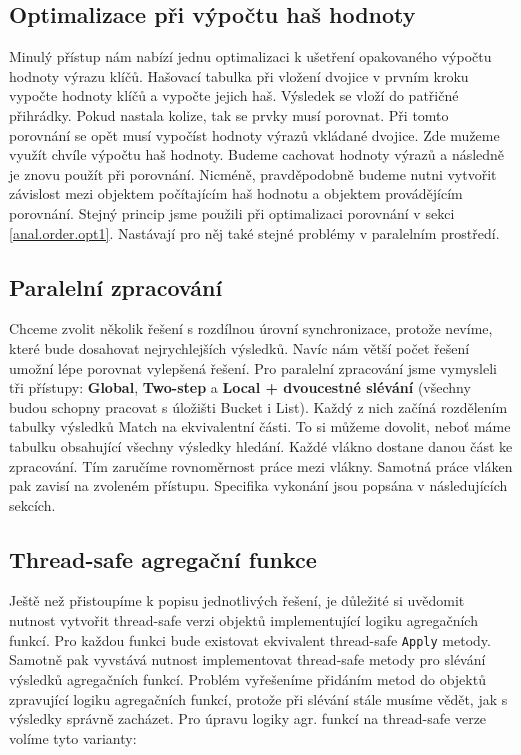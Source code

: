 \subsection{Optimalizace při výpočtu haš hodnoty}

Minulý přístup nám nabízí jednu optimalizaci k ušetření opakovaného výpočtu hodnoty výrazu klíčů.
Hašovací tabulka při vložení dvojice v prvním kroku vypočte hodnoty klíčů a vypočte jejich haš.
Výsledek se vloží do patřičné přihrádky.
Pokud nastala kolize, tak se prvky musí porovnat.
Při tomto porovnání se opět musí vypočíst hodnoty výrazů vkládané dvojice.
Zde mužeme využít chvíle výpočtu haš hodnoty.
Budeme cachovat hodnoty výrazů a následně je znovu použít při porovnání.
Nicméně, pravděpodobně budeme nutni vytvořit závislost mezi objektem počítajícím haš hodnotu a objektem provádějícím porovnání.
Stejný princip jsme použili při optimalizaci porovnání v sekci \ref{anal.order.opt1}.
Nastávají pro něj také stejné problémy v paralelním prostředí.

\subsection{Paralelní zpracování}

Chceme zvolit několik řešení s rozdílnou úrovní synchronizace, protože nevíme, které bude dosahovat nejrychlejších výsledků.
Navíc nám větší počet řešení umožní lépe porovnat vylepšená řešení.
Pro paralelní zpracování jsme vymysleli tři přístupy: \textbf{Global}, \textbf{Two-step} a \textbf{Local + dvoucestné slévání} (všechny budou schopny pracovat s úložišti Bucket i List).
Každý z nich začíná rozdělením tabulky výsledků Match na ekvivalentní části.
To si můžeme dovolit, neboť máme tabulku obsahující všechny výsledky hledání.
Každé vlákno dostane danou část ke zpracování.
Tím zaručíme rovnoměrnost práce mezi vlákny.
Samotná práce vláken pak zavisí na zvoleném přístupu.
Specifika vykonání jsou popsána v následujících sekcích.

\subsection{Thread-safe agregační funkce}

Ještě než přistoupíme k popisu jednotlivých řešení, je důležité si uvědomit nutnost vytvořit thread-safe verzi objektů implementující logiku agregačních funkcí.
Pro každou funkci bude existovat ekvivalent thread-safe \texttt{Apply} metody.
Samotně pak vyvstává nutnost implementovat thread-safe metody pro slévání výsledků agregačních funkcí.
Problém vyřešeníme přidáním metod do objektů zpravující logiku agregačních funkcí, protože při slévání stále musíme vědět, jak s výsledky správně zacházet.
Pro úpravu logiky agr. funkcí na thread-safe verze volíme tyto varianty:

